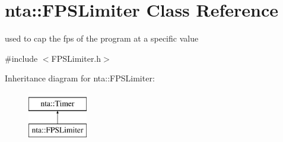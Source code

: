 \hypertarget{classnta_1_1FPSLimiter}{}\section{nta\+:\+:F\+P\+S\+Limiter Class Reference}
\label{classnta_1_1FPSLimiter}


used to cap the fps of the program at a specific value  




{\ttfamily \#include $<$F\+P\+S\+Limiter.\+h$>$}

Inheritance diagram for nta\+:\+:F\+P\+S\+Limiter\+:\begin{figure}[H]
\begin{center}
\leavevmode
\includegraphics[height=2.000000cm]{classnta_1_1FPSLimiter}
\end{center}
\end{figure}
